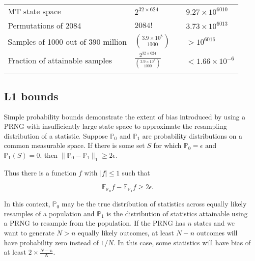 \documentclass[graybox]{svmult}
\begin{document}
\begin{table}
\begin{tabular}[h]{p{4cm}p{2.4cm}p{4cm}p{2cm}}
MT state space & $2^{32 \times 624}$ & & $9.27\times 10^{6010}$ \\
Permutations of 2084 & $2084!$ &   & $3.73 \times 10^{6013}$ \\
Samples of 1000 out of 390 million & ${3.9\times 10^8 \choose 1000}$ & & $> 10^{6016}$ \\
Fraction of attainable samples & $\frac{2^{32 \times 624}}{{3.9\times 10^8 \choose 1000}}$ &  & $< 1.66 \times 10^{-6}$ \\
\noalign{\smallskip}\svhline\noalign{\smallskip}
\end{tabular}
\end{table}





\subsection{L1 bounds}\label{sec:L1bounds}

Simple probability bounds demonstrate the extent of bias introduced by using a PRNG with insufficiently large
state space to approximate the resampling distribution of a statistic.
Suppose ${\mathbb P}_0$ and ${\mathbb P}_1$ are probability distributions on a common measurable space. 
If there is some set $S$ for which ${\mathbb P}_0 = \epsilon$ and ${\mathbb P}_1(S) = 0$, then $\|{\mathbb P}_0 - {\mathbb P}_1 \|_1 \ge 2 \epsilon$.

Thus there is a function $f$ with $|f| \le 1$ such that 

$${\mathbb E}_{{\mathbb P}_0}f -  {\mathbb E}_{{\mathbb P}_1}f \ge 2 \epsilon.$$

In this context, ${\mathbb P}_0$ may be the true distribution of statistics across equally likely resamples of a population 
and ${\mathbb P}_1$ is the distribution of statistics attainable using a PRNG to resample from the population.
If the PRNG has $n$ states and we want to generate $N>n$ equally likely outcomes, at least $N-n$ outcomes will have probability zero instead of $1/N$.
In this case, some statistics will have bias of at least $2 \times \frac{N-n}{N}$.
\end{document}
